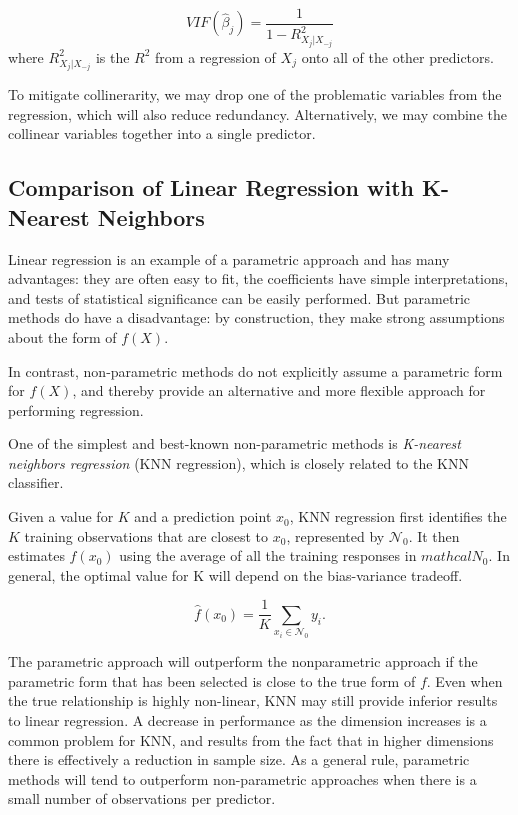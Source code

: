 \documentclass{article}
\begin{document}
\begin{enumerate}
    \[
        VIF(\hat \beta_j ) = \frac{1}{1-R^2_{X_j|X_{-j}}}
    \]
    where $R^2_{X_j|X_{-j}}$ is the $R^2$ from a regression of $X_j$ onto all of the other predictors.
    
    To mitigate collinerarity, we may drop one of the problematic variables from the regression, which will also reduce redundancy. Alternatively, we may combine the collinear variables together into a single predictor.
    
\subsection{Comparison of Linear Regression with K-Nearest Neighbors}
Linear regression is an example of a parametric approach and has many advantages: they are often easy to fit, the coefficients have simple interpretations, and tests of statistical significance can be easily performed. But parametric methods do have a disadvantage: by construction, they make strong assumptions about the form of $f(X)$. 

In contrast, non-parametric methods do not explicitly assume a parametric form for $f(X)$, and thereby provide an alternative and more flexible approach for performing regression. 

One of the simplest and best-known non-parametric methods is \textit{K-nearest neighbors regression} (KNN regression), which is closely related to the KNN classifier.

Given a value for $K$ and a prediction point $x_0$, KNN regression first identifies the $K$ training observations that are closest to $x_0$, represented by $\mathcal N_0$. It then estimates $f(x_0)$ using the average of all the training responses in $mathcal N_0$. In general, the optimal value for K will depend on the bias-variance tradeoff.

\[
    \hat f (x_0) = \frac{1}{K} \sum_{x_i \in \mathcal N_0} y_i.
\]

The parametric approach will outperform the nonparametric approach if the parametric form that has been selected is close to the true form of $f$. Even when the true relationship is highly non-linear, KNN may still provide inferior results to linear regression. A decrease in performance as the dimension increases is a common problem for KNN, and results from the fact that in higher dimensions there is effectively a reduction in sample size. As a general rule, parametric methods will tend to outperform non-parametric approaches when there is a small number of observations per predictor.


\end{enumerate}
\end{document}
